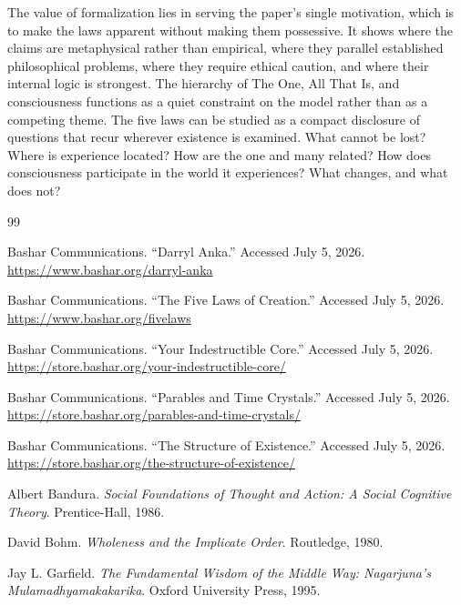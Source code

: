 \documentclass[11pt]{article}
\begin{document}
The value of formalization lies in serving the paper's single motivation, which is to make the laws apparent without making them possessive.  It shows where the claims are metaphysical rather than empirical, where they parallel established philosophical problems, where they require ethical caution, and where their internal logic is strongest.  The hierarchy of The One, All That Is, and consciousness functions as a quiet constraint on the model rather than as a competing theme.  The five laws can be studied as a compact disclosure of questions that recur wherever existence is examined.  What cannot be lost?  Where is experience located?  How are the one and many related?  How does consciousness participate in the world it experiences?  What changes, and what does not?

\begin{thebibliography}{99}
\raggedright

Bashar Communications.
\newblock ``Darryl Anka.''
\newblock Accessed July 5, 2026.
\newblock \url{https://www.bashar.org/darryl-anka}

Bashar Communications.
\newblock ``The Five Laws of Creation.''
\newblock Accessed July 5, 2026.
\newblock \url{https://www.bashar.org/fivelaws}

Bashar Communications.
\newblock ``Your Indestructible Core.''
\newblock Accessed July 5, 2026.
\newblock \url{https://store.bashar.org/your-indestructible-core/}

Bashar Communications.
\newblock ``Parables and Time Crystals.''
\newblock Accessed July 5, 2026.
\newblock \url{https://store.bashar.org/parables-and-time-crystals/}

Bashar Communications.
\newblock ``The Structure of Existence.''
\newblock Accessed July 5, 2026.
\newblock \url{https://store.bashar.org/the-structure-of-existence/}

Albert Bandura.
\newblock \emph{Social Foundations of Thought and Action: A Social Cognitive Theory}.
\newblock Prentice-Hall, 1986.

David Bohm.
\newblock \emph{Wholeness and the Implicate Order}.
\newblock Routledge, 1980.

Jay L. Garfield.
\newblock \emph{The Fundamental Wisdom of the Middle Way: Nagarjuna's Mulamadhyamakakarika}.
\newblock Oxford University Press, 1995.


\end{thebibliography}
\end{document}
